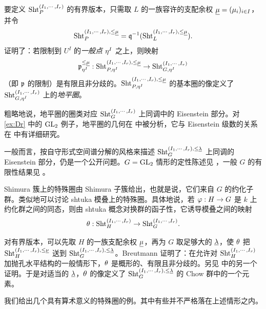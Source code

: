 要定义 $\textup{Sht}^{(I_{1},\cdots, I_{r})}_{P}$ 的有界版本，只需取 $L$ 的一族容许的支配余权 $\underline\mu=(\mu_{i})_{i\in I}$，并令
\begin{equation*}
\textup{Sht}_{P}^{(I_{1},\cdots, I_{r}), \le\underline\mu}=\mathfrak{q}^{-1}(\textup{Sht}_{L}^{(I_{1},\cdots, I_{r}), \le\underline\mu} ).
\end{equation*}
\cite[Proposition 5.7]{Var} 证明了：若限制到 $U^{I}$ 的\emph{一般点 $\eta^{I}$} 之上，则映射
$$\mathfrak{p}^{\le\underline\mu}_{\eta^{I}}: \textup{Sht}_{P,\eta^{I}}^{(I_{1},\cdots, I_{r}), \le\underline\mu}\to \textup{Sht}_{G,\eta^{I}}^{(I_{1},\cdots, I_{r})}$$
（即 $\mathfrak{p}$ 的限制）是有限且非分歧的。$\textup{Sht}_{P,\eta^{I}}^{(I_{1},\cdots, I_{r}), \le\underline\mu}$ 的基本圈的像定义了 $\textup{Sht}_{G,\eta^{I}}^{(I_{1},\cdots, I_{r})}$ 上的\emph{地平圈}。

粗略地说，地平圈的圈类对应 $\textup{Sht}_{G}^{(I_{1},\cdots, I_{r})}$ 上同调中的 Eisenstein 部分。对 \ref{ex:Dr} 中的 $\textup{GL}_{2}$ 例子，地平圈的几何在 \cite[\S4]{Dr-FBun} 中被分析，它与 Eisenstein 级数的关系在 \cite[\S3]{Dr-Pet} 中有详细研究。

一般而言，按自守形式空间谱分解的风格来描述 $\textup{Sht}_{G}^{(I_{1},\cdots, I_{r}),\le\underline{\lambda}}$ 上同调的 Eisenstein 部分，仍是一个公开问题。$G=\textup{GL}_{2}$ 情形的定性陈述见 \cite[\S7]{YZ1}，一般 $G$ 的有限性结果见 \cite{X}。


Shimura 簇上的特殊圈由 Shimura 子簇给出，也就是说，它们来自 $G$ 的约化子群。类似地可以讨论 shtuka 模叠上的特殊圈。具体地说，若 $\varphi: H\to G$ 是 $k$ 上约化群之间的同态，则由 shtuka 概念对换群的函子性，它诱导模叠之间的映射
$$\theta: \textup{Sht}^{(I_{1},\cdots, I_{r})}_{H}\to \textup{Sht}^{(I_{1},\cdots, I_{r})}_{G}.$$

对有界版本，可以先取 $H$ 的一族支配余权 $\underline\mu$，再为 $G$ 取足够大的 $\underline{\lambda}$，使 $\theta$ 把 $\textup{Sht}^{(I_{1},\cdots, I_{r}), \le\underline\nu}_{H}$ 送到 $\textup{Sht}^{(I_{1},\cdots, I_{r}), \le\underline{\lambda}}_{G}$。Breutmann \cite{Br} 证明了：在允许对 $\textup{Sht}^{(I_{1},\cdots, I_{r})}_{H}$ 加抛孔水平结构的一般情形下，$\theta$ 是概形的、有限且非分歧的。另见 \cite{Y-cycle} 中的另一个证明。于是对适当的 $\underline{\lambda}$，$\theta$ 的像定义了 $\textup{Sht}^{(I_{1},\cdots, I_{r}),\le\underline{\lambda}}_{G}$ 的 Chow 群中的一个元素。

我们给出几个具有算术意义的特殊圈的例。其中有些并不严格落在上述情形之内。

